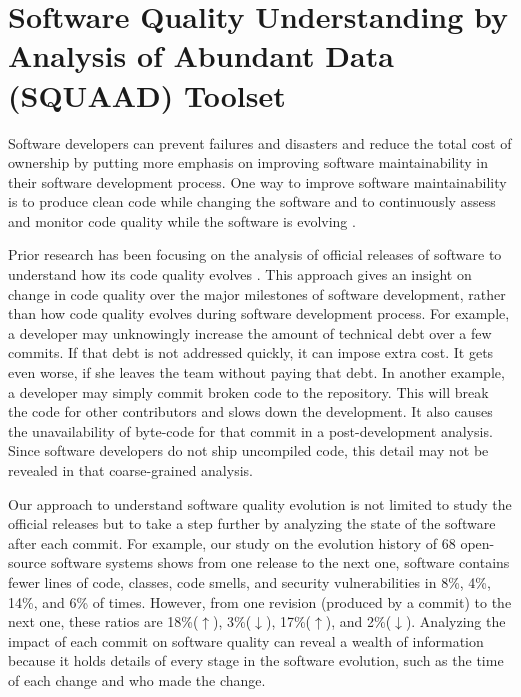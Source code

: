 \section{Software Quality Understanding by Analysis of Abundant Data (SQUAAD) Toolset}
\label{sec:squaad}

Software developers can prevent failures and disasters and reduce the total cost of ownership by putting more emphasis on improving software maintainability in their software development process.
One way to improve software maintainability is to produce clean code while changing the software and to continuously assess and monitor code quality while the software is evolving \cite {mexim2015introduction}.

Prior research has been focusing on the analysis of official releases of software to understand how its code quality evolves \cite{PINTO201559,tu2000evolution,ganpati2012comparative,d2008analysing,le2015empirical}.
This approach gives an insight on change in code quality over the major milestones of software development, rather than how code quality evolves during software development process. 
For example, a developer may unknowingly increase the amount of technical debt over a few commits. If that debt is not addressed quickly, it can impose extra cost.
It gets even worse, if she leaves the team without paying that debt.
In another example, a developer may simply commit broken code to the repository.
This will break the code for other contributors and slows down the development.
It also causes the unavailability of byte-code for that commit in a post-development analysis.
Since software developers do not ship uncompiled code, this detail may not be revealed in that coarse-grained analysis. 

Our approach to understand software quality evolution is not limited to study the official releases but to take a step further by analyzing the state of the software after each commit.
For example, our study on the evolution history of  68 open-source software systems shows from one release to the next one, software contains fewer lines of code, classes, code smells, and security vulnerabilities in 8\%, 4\%, 14\%, and 6\% of times.
However, from one revision (produced by a commit) to the next one, these ratios are 18\%($\uparrow$), 3\%($\downarrow$), 17\%($\uparrow$), and 2\%($\downarrow$).
Analyzing the impact of each commit on software quality can reveal a wealth of information because it holds details of every stage in the software evolution, such as the time of each change and who made the change.

